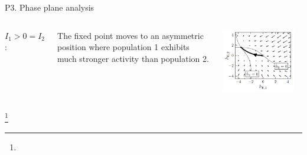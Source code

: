 \documentclass[xcolor=table,dvipsnames,svgnames,aspectratio=169,fontset=fandol]{ctexbeamer}
\begin{document}
\begin{frame}{P3. Phase plane analysis}
  \begin{columns}
    \textbf{$I_1 > 0 = I_2$}:

    \vskip 12pt
    The fixed point moves to an asymmetric position where population 1 exhibits much stronger activity than population 2. 

    \includegraphics[width=0.9\textwidth,height=0.8\textheight]{phase2.png}
  \end{columns}\footnote{}   
\end{frame}
\end{document}
